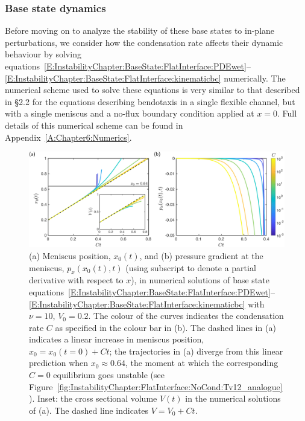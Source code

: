 \subsubsection{Base state dynamics}\label{S:InstabilityChapter:WithCondensation:BaseStateDynamics}
Before moving on to analyze the stability of these base states to in-plane perturbations, we consider how the condensation rate affects their dynamic behaviour by solving equations~\eqref{E:InstabilityChapter:BaseState:FlatInterface:PDEwet}--\eqref{E:InstabilityChapter:BaseState:FlatInterface:kinematicbc} numerically. The numerical scheme used to solve these equations is very similar to that described in \S2.2 for the equations describing bendotaxis in a single flexible channel, but with a single meniscus and a no-flux boundary condition applied at $x = 0$.  Full details of this numerical scheme can be found in Appendix~\ref{A:Chapter6:Numerics}.

\begin{figure}[t]
\includegraphics[width = \textwidth]{base_state_dynamicsv2}
\caption{ (a) Meniscus position, $x_0(t)$, and (b) pressure gradient at the meniscus, $p_x(x_0(t),t)$ (using subscript to denote a partial derivative with respect to $x$), in numerical solutions of base state equations~\eqref{E:InstabilityChapter:BaseState:FlatInterface:PDEwet}--\eqref{E:InstabilityChapter:BaseState:FlatInterface:kinematicbc} with $\nu = 10$, $V_0 = 0.2$. The colour of the curves indicates the condensation rate $C$ as specified in the colour bar in (b). The dashed lines in (a) indicates a linear increase in meniscus position, $x_0 = x_0(t = 0) + Ct$; the trajectories in (a) diverge from this linear prediction when $x_0 \approx 0.64$, the moment at which the corresponding $C = 0$ equilibrium goes unstable (see Figure~\ref{fig:InstabilityChapter:FlatInterface:NoCond:Tv12_analogue}). Inset: the cross sectional volume $V(t)$ in the numerical solutions of (a). The dashed line indicates $V = V_0 + Ct$. }\label{E:InstabilityChapter:WithCondensation:BaseState:Dynamics}
\end{figure}

